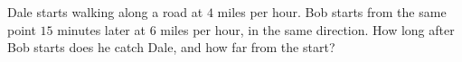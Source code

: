 Dale starts walking along a road at $4$ miles per hour. Bob starts from the same point $15$ minutes later at $6$ miles per hour, in the same direction. How long after Bob starts does he catch Dale, and how far from the start?
